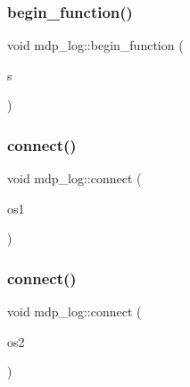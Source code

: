 \mbox{\label{classmdp__log_a7fac0134af18caa8311bbf3118b82df1}} 
\subsubsection{\texorpdfstring{begin\+\_\+function()}{begin\_function()}}
{\footnotesize\ttfamily void mdp\+\_\+log\+::begin\+\_\+function (\begin{DoxyParamCaption}\item[{string}]{s }\end{DoxyParamCaption})\hspace{0.3cm}{\ttfamily [inline]}}

\mbox{\label{classmdp__log_a8e468b9b08d5008bbf87207a0184c809}} 
\subsubsection{\texorpdfstring{connect()}{connect()}\hspace{0.1cm}{\footnotesize\ttfamily [1/2]}}
{\footnotesize\ttfamily void mdp\+\_\+log\+::connect (\begin{DoxyParamCaption}\item[{ostream \&}]{os1 }\end{DoxyParamCaption})\hspace{0.3cm}{\ttfamily [inline]}}

\mbox{\label{classmdp__log_a9f9fbc3647e989231c4016179c2932d3}} 
\subsubsection{\texorpdfstring{connect()}{connect()}\hspace{0.1cm}{\footnotesize\ttfamily [2/2]}}
{\footnotesize\ttfamily void mdp\+\_\+log\+::connect (\begin{DoxyParamCaption}\item[{ofstream \&}]{os2 }\end{DoxyParamCaption})\hspace{0.3cm}{\ttfamily [inline]}}

